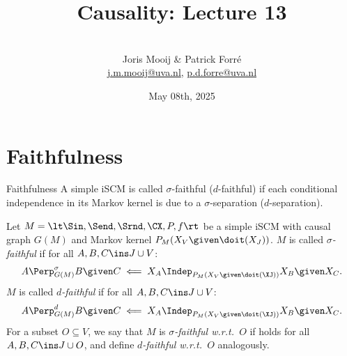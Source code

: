 \title[Causality]{Causality: Lecture 13}
\author[Joris Mooij]{\\[5mm]\large Joris Mooij \& Patrick Forr\'e\\
\url{j.m.mooij@uva.nl}, \url{p.d.forre@uva.nl}}
\date[2025-05-08]{\normalsize May 08th, 2025}
\maketitle


\part{Faithfulness}
\frame{\partpage}

\begin{frame}{Faithfulness}
A simple iSCM is called $\sigma$-faithful ($d$-faithful) if each conditional independence in its Markov kernel
is due to a $\sigma$-separation ($d$-separation).
\begin{Def}[\ref{def:faithfulness}]
  Let $M = \lt \Sin, \Send, \Srnd, \CX, P, f \rt$ be a simple iSCM with causal graph $G(M)$
  and Markov kernel $P_{M}(X_V \given \doit(X_J))$.
  $M$ is called \emph{$\sigma$-faithful} if 
  for all $A, B, C \ins J \cup V$:
  \begin{equation}\label{slides:eq:sigma_faithful}
    A \Perp^\sigma_{G(M)} B \given C \impliedby X_A \Indep_{P_{M}(X_V \given \doit(\XJ))} X_B \given X_C.
  \end{equation}
  $M$ is called \emph{$d$-faithful} if
  for all $A, B, C \ins J \cup V$:
  \begin{equation*}
    A \Perp^d_{G(M)} B \given C \impliedby X_A \Indep_{P_{M}(X_V \given \doit(\XJ))} X_B \given X_C.
  \end{equation*}
  For a subset $O \subseteq V$, we say that $M$ is \emph{$\sigma$-faithful w.r.t.\ $O$} if
   holds for all $A, B, C \ins J \cup O$, and define
  \emph{$d$-faithful w.r.t.\ $O$} analogously.
\end{Def}
\end{frame}

